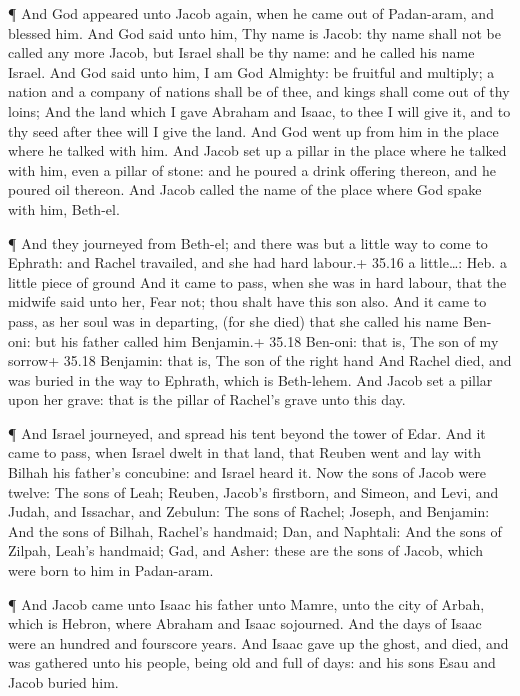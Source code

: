  ¶ And God appeared unto Jacob again, when he came out of
Padan-aram, and blessed him.  And God said unto him, Thy
name is Jacob: thy name shall not be called any more Jacob, but Israel
shall be thy name: and he called his name Israel.  And God
said unto him, I am God Almighty: be fruitful and multiply; a nation and
a company of nations shall be of thee, and kings shall come out of thy
loins;  And the land which I gave Abraham and Isaac, to
thee I will give it, and to thy seed after thee will I give the land.
 And God went up from him in the place where he talked with
him.  And Jacob set up a pillar in the place where he
talked with him, even a pillar of stone: and he poured a drink offering
thereon, and he poured oil thereon.  And Jacob called the
name of the place where God spake with him, Beth-el.

 ¶ And they journeyed from Beth-el; and there was but a
little way to come to Ephrath: and Rachel travailed, and she had hard
labour.+ 35.16 a little\ldots: Heb. a little piece of ground
 And it came to pass, when she was in hard labour, that the
midwife said unto her, Fear not; thou shalt have this son also.
 And it came to pass, as her soul was in departing, (for
she died) that she called his name Ben-oni: but his father called him
Benjamin.+ 35.18 Ben-oni: that is, The son of my sorrow+ 35.18 Benjamin:
that is, The son of the right hand  And Rachel died, and
was buried in the way to Ephrath, which is Beth-lehem.  And
Jacob set a pillar upon her grave: that is the pillar of Rachel's grave
unto this day.

 ¶ And Israel journeyed, and spread his tent beyond the
tower of Edar.  And it came to pass, when Israel dwelt in
that land, that Reuben went and lay with Bilhah his father's concubine:
and Israel heard it. Now the sons of Jacob were twelve: 
The sons of Leah; Reuben, Jacob's firstborn, and Simeon, and Levi, and
Judah, and Issachar, and Zebulun:  The sons of Rachel;
Joseph, and Benjamin:  And the sons of Bilhah, Rachel's
handmaid; Dan, and Naphtali:  And the sons of Zilpah,
Leah's handmaid; Gad, and Asher: these are the sons of Jacob, which were
born to him in Padan-aram.

 ¶ And Jacob came unto Isaac his father unto Mamre, unto
the city of Arbah, which is Hebron, where Abraham and Isaac sojourned.
 And the days of Isaac were an hundred and fourscore years.
 And Isaac gave up the ghost, and died, and was gathered
unto his people, being old and full of days: and his sons Esau and Jacob
buried him.

